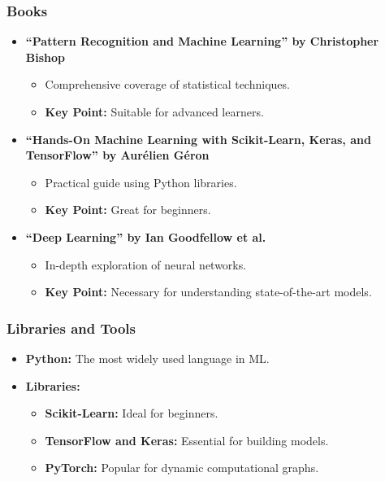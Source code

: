 \documentclass{beamer}
\begin{document}
\begin{frame}
    \frametitle{Books}
    \begin{itemize}
        \item \textbf{``Pattern Recognition and Machine Learning'' by Christopher Bishop}
            \begin{itemize}
                \item Comprehensive coverage of statistical techniques.
                \item \textbf{Key Point:} Suitable for advanced learners.
            \end{itemize}

        \item \textbf{``Hands-On Machine Learning with Scikit-Learn, Keras, and TensorFlow'' by Aurélien Géron}
            \begin{itemize}
                \item Practical guide using Python libraries.
                \item \textbf{Key Point:} Great for beginners.
            \end{itemize}

        \item \textbf{``Deep Learning'' by Ian Goodfellow et al.}
            \begin{itemize}
                \item In-depth exploration of neural networks.
                \item \textbf{Key Point:} Necessary for understanding state-of-the-art models.
            \end{itemize}
    \end{itemize}
\end{frame}

\begin{frame}
    \frametitle{Libraries and Tools}
    \begin{itemize}
        \item \textbf{Python:} The most widely used language in ML.
        \item \textbf{Libraries:}
            \begin{itemize}
                \item \textbf{Scikit-Learn:} Ideal for beginners.
                \item \textbf{TensorFlow and Keras:} Essential for building models.
                \item \textbf{PyTorch:} Popular for dynamic computational graphs.
            \end{itemize}
    \end{itemize}
\end{frame}
\end{document}

